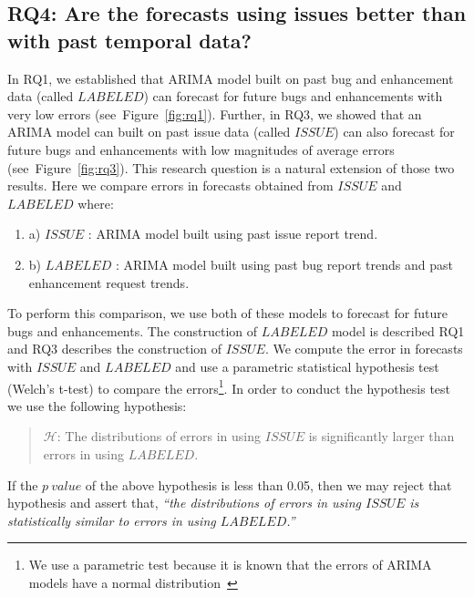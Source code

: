 \documentclass[sigconf, preprint]{acmart}
\newcommand{\be}{\begin{enumerate}}
\newcommand{\ee}{\end{enumerate}}
\newcommand{\fig}[1]{Figure~\ref{fig:#1}}
\begin{document}
\subsection*{\normalsize{RQ4: Are the forecasts using issues better than with past temporal data?}}


In RQ1, we established that ARIMA model built on past bug and enhancement data 
(called $\mathit{LABELED}$) can forecast for future bugs and enhancements with 
very low errors (see~\fig{rq1}). Further, in RQ3, we showed that an ARIMA model 
can built on past issue data (called $\mathit{ISSUE}$) can also forecast for 
future bugs and enhancements with low magnitudes of average errors 
(see~\fig{rq3}). This research question is a natural extension of those two 
results. Here we compare errors in forecasts obtained from $\mathit{ISSUE}$ and 
$\mathit{LABELED}$ where: 
\be
\item[] a) $\mathit{ISSUE}$ : ARIMA model built using past issue report trend.
\item[] b) $\mathit{LABELED}$ : ARIMA model built using past bug report trends 
and past enhancement request trends.
\ee

To perform this comparison, we use both of these models to forecast for future bugs and enhancements. 
The construction of $\mathit{LABELED}$ model is described RQ1 and RQ3 describes 
the construction of $\mathit{ISSUE}$. We compute the error in forecasts with  
$\mathit{ISSUE}$ and $\mathit{LABELED}$ and use a parametric statistical 
hypothesis test 
(Welch's t-test) to compare the errors\footnote{We use a parametric test 
because it is known that the errors of ARIMA models have a normal 
distribution~\cite{box2015time}}. In order to conduct the hypothesis test we use the following hypothesis:
\begin{quote}
$\mathcal{H}$: The distributions of errors in using $\mathit{ISSUE}$ is significantly larger
than errors in using $\mathit{LABELED}$.
\end{quote}

If the $p~value$ of the above hypothesis is less than 0.05, then we may reject 
that hypothesis and assert that, \textit{``the distributions of errors in using 
$\mathit{ISSUE}$ is statistically similar to errors in using 
$\mathit{LABELED}$.''}
\end{document}
